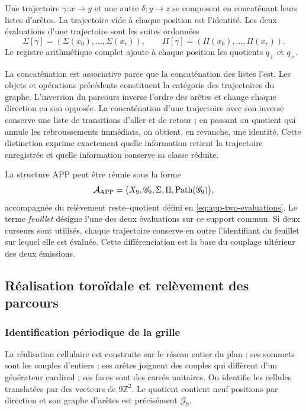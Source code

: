 \begin{definicion}
\label{geo:def-composicion}
Une trajectoire $\gamma:x\to y$ et une autre $\delta:y\to z$ se composent en concaténant leurs listes d'arêtes. La trajectoire vide à chaque position est l'identité. Les deux évaluations d'une trajectoire sont les suites ordonnées
\[
 \Sigma[\gamma]=(\Sigma(x_0),\ldots,\Sigma(x_r)),\qquad
 \Pi[\gamma]=(\Pi(x_0),\ldots,\Pi(x_r)).
\]
Le registre arithmétique complet ajoute à chaque position les quotients $q_+$ et $q_\times$.
\end{definicion}

La concaténation est associative parce que la concaténation des listes l'est. Les objets et opérations précédents constituent la catégorie des trajectoires du graphe. L'inversion du parcours inverse l'ordre des arêtes et change chaque direction en son opposée. La concaténation d'une trajectoire avec son inverse conserve une liste de transitions d'aller et de retour ; en passant au quotient qui annule les rebroussements immédiats, on obtient, en revanche, une identité. Cette distinction exprime exactement quelle information retient la trajectoire enregistrée et quelle information conserve sa classe réduite.

La structure APP peut être réunie sous la forme
\[
 \mathcal A_{\rm APP}=
 \bigl(X_9,\mathscr G_9,\Sigma,\Pi,
             \operatorname{Path}(\mathscr G_9)\bigr),
\]
accompagnée du relèvement reste--quotient défini en \eqref{eq:app-two-evaluations}. Le terme \emph{feuillet} désigne l'une des deux évaluations sur ce support commun. Si deux curseurs sont utilisés, chaque trajectoire conserve en outre l'identifiant du feuillet sur lequel elle est évaluée. Cette différenciation est la base du couplage ultérieur des deux émissions.

\subsection{Réalisation toroïdale et relèvement des parcours}
\label{geo:toro}

\subsubsection{Identification périodique de la grille}

La réalisation cellulaire est construite sur le réseau entier du plan : ses sommets sont les couples d'entiers ; ses arêtes joignent des couples qui diffèrent d'un générateur cardinal ; ses faces sont des carrés unitaires. On identifie les cellules translatées par des vecteurs de $9\mathbb Z^2$. Le quotient contient neuf positions par direction et son graphe d'arêtes est précisément $\mathscr G_9$.

